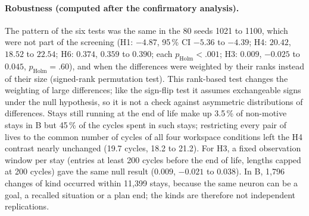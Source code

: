 \documentclass[11pt,a4paper]{article}
\begin{document}
{\footnotesize\setlength{\tabcolsep}{4pt}}

\paragraph{Robustness (computed after the confirmatory analysis).} The pattern of the six tests was the same in the 80 seeds 1021 to 1100, which were not part of the screening (H1: $-4.87$, 95\,\% CI $-5.36$ to $-4.39$; H4: $20.42$, $18.52$ to $22.54$; H6: $0.374$, $0.359$ to $0.390$; each $p_{\mathrm{Holm}} < .001$; H3: $0.009$, $-0.025$ to $0.045$, $p_{\mathrm{Holm}} = .60$), and when the differences were weighted by their ranks instead of their size (signed-rank permutation test). This rank-based test changes the weighting of large differences; like the sign-flip test it assumes exchangeable signs under the null hypothesis, so it is not a check against asymmetric distributions of differences. Stays still running at the end of life make up 3.5\,\% of non-motive stays in B but 45\,\% of the cycles spent in such stays; restricting every pair of lives to the common number of cycles of all four workspace conditions left the H4 contrast nearly unchanged (19.7 cycles, 18.2 to 21.2). For H3, a fixed observation window per stay (entries at least 200 cycles before the end of life, lengths capped at 200 cycles) gave the same null result ($0.009$, $-0.021$ to $0.038$). In B, 1{,}796 changes of kind occurred within 11{,}399 stays, because the same neuron can be a goal, a recalled situation or a plan end; the kinds are therefore not independent replications.
\end{document}
